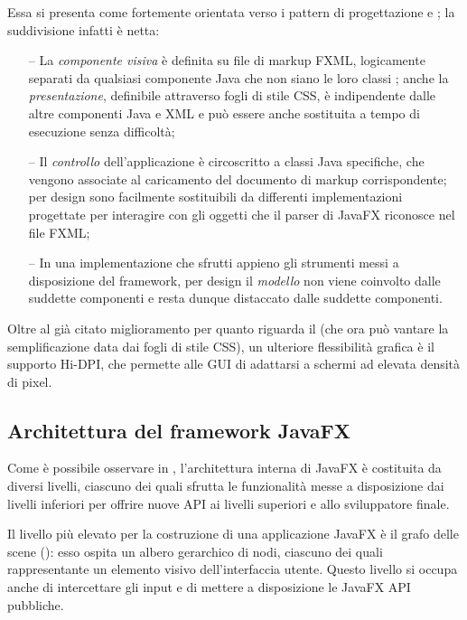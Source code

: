             Essa si presenta come fortemente orientata verso i pattern di progettazione  e ;
            la suddivisione infatti è netta:
            \begin{itemize}
                \item[--]
                    La \emph{componente visiva} è definita su file di markup FXML, logicamente separati da qualsiasi componente Java che non siano le loro classi ;
                    anche la \emph{presentazione}, definibile attraverso fogli di stile CSS, è indipendente dalle altre componenti Java e XML e può essere anche sostituita a tempo di esecuzione senza difficoltà;
                \item[--]
                    Il \emph{controllo} dell'applicazione è circoscritto a classi Java specifiche, che vengono associate al caricamento del documento di markup corrispondente;
                    per design sono facilmente sostituibili da differenti implementazioni progettate per interagire con gli oggetti che il parser di JavaFX riconosce nel file FXML;
                \item[--]
                    In una implementazione che sfrutti appieno gli strumenti messi a disposizione del framework, per design il \emph{modello} non viene coinvolto dalle suddette componenti e resta dunque distaccato dalle suddette componenti.
            \end{itemize}

            Oltre al già citato miglioramento per quanto riguarda il  (che ora può vantare la semplificazione data dai fogli di stile CSS), un ulteriore flessibilità grafica è il supporto Hi-DPI, che permette alle GUI di adattarsi a schermi ad elevata densità di pixel.

        \subsection{Architettura del framework JavaFX}\label{subsec:jfxFramework}
            Come è possibile osservare in , l'architettura interna di JavaFX è costituita da diversi livelli, ciascuno dei quali sfrutta le funzionalità messe a disposizione dai livelli inferiori per offrire nuove API ai livelli superiori e allo sviluppatore finale.

            Il livello più elevato per la costruzione di una applicazione JavaFX è il grafo delle scene ():
            esso ospita un albero gerarchico di nodi, ciascuno dei quali rappresentante un elemento visivo dell'interfaccia utente.
            Questo livello si occupa anche di intercettare gli input e di mettere a disposizione le JavaFX API pubbliche.

